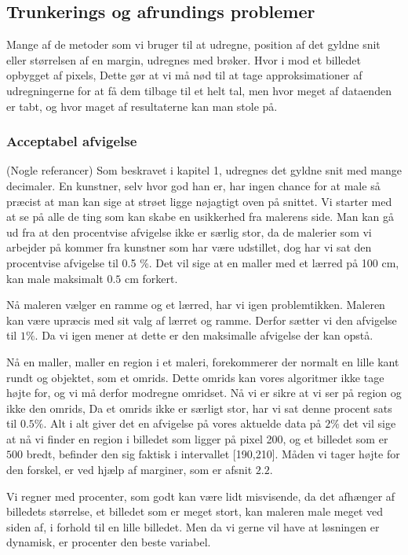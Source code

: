 \subsection*{Trunkerings og afrundings problemer}
Mange af de metoder som vi bruger til at udregne, position af det gyldne
snit eller størrelsen af en margin, udregnes med brøker. Hvor i mod et
billedet opbygget af pixels, Dette gør at vi må nød til at tage
approksimationer af udregningerne for at få dem tilbage til et helt tal,
men hvor meget af dataenden er tabt, og hvor maget af resultaterne kan
man stole på.

\subsubsection{Acceptabel afvigelse}
(Nogle referancer)
Som beskravet i kapitel 1, udregnes det gyldne snit med mange decimaler.
En kunstner, selv hvor god han er, har ingen chance for at male så
præcist at man kan sige at strøet ligge nøjagtigt oven på snittet. Vi
starter med at se på alle de ting som kan skabe en usikkerhed fra
malerens side. Man kan gå ud fra at den procentvise afvigelse ikke er
særlig stor, da de malerier som vi arbejder på kommer fra kunstner som
har være udstillet, dog har vi sat den procentvise afvigelse til 0.5 \%.
Det vil sige at en maller med et lærred på 100 cm, kan male maksimalt
$0.5$ cm forkert.

Nå maleren vælger en ramme og et lærred, har vi igen problemtikken.
Maleren kan være upræcis med sit valg af lærret og ramme. Derfor sætter
vi den afvigelse til $1\%$. Da vi igen mener at dette er den maksimalle
afvigelse der kan opstå.

Nå en maller, maller en region i et maleri, forekommerer der normalt en
lille kant rundt og objektet, som et omrids. Dette omrids kan vores
algoritmer ikke tage højte for, og vi må derfor modregne omridset. Nå vi
er sikre at vi ser på region og ikke den omrids, Da et omrids ikke er
særligt stor, har vi sat denne procent sats til $0.5\%$. Alt i alt giver
det en afvigelse på vores aktuelde data på $2\%$ det vil sige at nå vi
finder en region i billedet som ligger på pixel 200, og et billedet som
er $500$ bredt, befinder den sig faktisk i intervallet [190,210]. Måden
vi tager højte for den forskel, er ved hjælp af marginer, som er afsnit
$2.2$.

Vi regner med procenter, som godt kan være lidt misvisende, da det
afhænger af billedets størrelse, et billedet som er meget stort, kan
maleren male meget ved siden af, i forhold til en lille billedet. Men
da vi gerne vil have at løsningen er dynamisk, er procenter den beste
variabel.

